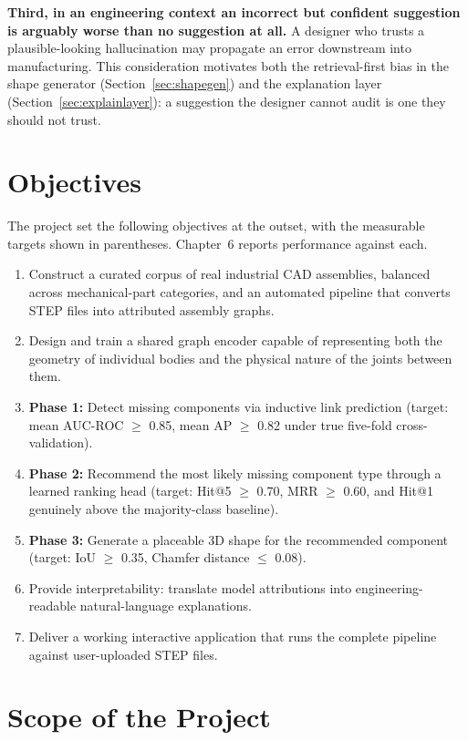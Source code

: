 \documentclass[12pt,oneside,a4paper]{report}
\begin{document}
\textbf{Third, in an engineering context an incorrect but confident
suggestion is arguably worse than no suggestion at all.} A designer who
trusts a plausible-looking hallucination may propagate an error downstream
into manufacturing. This consideration motivates both the retrieval-first
bias in the shape generator (Section~\ref{sec:shapegen}) and the explanation
layer (Section~\ref{sec:explainlayer}): a suggestion the designer cannot
audit is one they should not trust.

\section{Objectives}

The project set the following objectives at the outset, with the measurable
targets shown in parentheses. Chapter~6 reports performance against each.

\begin{enumerate}[label=\textbf{O\arabic*.}, leftmargin=2.2cm]
\item Construct a curated corpus of real industrial CAD assemblies, balanced
across mechanical-part categories, and an automated pipeline that converts
STEP files into attributed assembly graphs.
\item Design and train a shared graph encoder capable of representing both
the geometry of individual bodies and the physical nature of the joints
between them.
\item \textbf{Phase 1:} Detect missing components via inductive link
prediction (target: mean AUC-ROC $\geq$ 0.85, mean AP $\geq$ 0.82 under true
five-fold cross-validation).
\item \textbf{Phase 2:} Recommend the most likely missing component type
through a learned ranking head (target: Hit@5 $\geq$ 0.70, MRR $\geq$ 0.60,
and Hit@1 genuinely above the majority-class baseline).
\item \textbf{Phase 3:} Generate a placeable 3D shape for the recommended
component (target: IoU $\geq$ 0.35, Chamfer distance $\leq$ 0.08).
\item Provide interpretability: translate model attributions into
engineering-readable natural-language explanations.
\item Deliver a working interactive application that runs the complete
pipeline against user-uploaded STEP files.
\end{enumerate}

\section{Scope of the Project}
\end{document}
